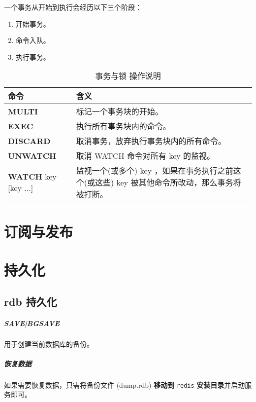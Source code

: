 \documentclass[UTF8,a4paper,12pt]{ctexbook}
\begin{document}
		一个事务从开始到执行会经历以下三个阶段：
			\begin{enumerate}[itemindent = 2em]
				\item 开始事务。
				\item 命令入队。
				\item 执行事务。
			\end{enumerate}
		
		\begin{table}[H]
			\centering
			\caption{事务与锁 操作说明}
			\begin{tabular}{p{5cm}<{\centering} | p{10cm}<{\centering}}
				\toprule
					命令 &  含义 \\
				\midrule
				\textbf{MULTI} 	 &  标记一个事务块的开始。	\\
				\textbf{EXEC} 	 & 	执行所有事务块内的命令。	\\
				\textbf{DISCARD} 	 &	取消事务，放弃执行事务块内的所有命令。	\\
				\textbf{UNWATCH} 	 &	取消 WATCH 命令对所有 key 的监视。	\\
				\textbf{WATCH} key [key ...] 	 &	监视一个(或多个) key ，如果在事务执行之前这个(或这些) key 被其他命令所改动，那么事务将被打断。	\\
				\bottomrule
			\end{tabular}
		\end{table}

\chapter{订阅与发布}



\chapter{持久化}	
	\section{rdb 持久化}
		\paragraph{SAVE|BGSAVE}
			用于创建当前数据库的备份。
			
		\paragraph{恢复数据}
			如果需要恢复数据，只需将备份文件 (dump.rdb) \textbf{移动到} \verb|redis| \textbf{安装目录}并启动服务即可。
			
\end{document}
